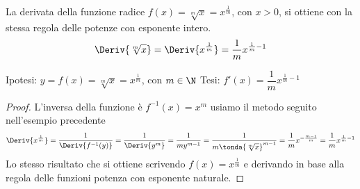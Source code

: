 \begin{teorema}
\label{teo:diff01_deri_x_alla_1_su_m}
La derivata della funzione radice \(f(x)=\sqrt[m]{x}=x^\frac{1}{m}\), 
con \(x > 0\),
si ottiene con la stessa regola delle potenze con esponente intero.
\[\Deriv{\sqrt[m]{x}} = \Deriv{x^\frac{1}{m}} = 
  \frac{1}{m}x^{\frac{1}{m}-1}\]
\end{teorema}
\noindent Ipotesi: \(y = f(x) = \sqrt[m]{x} = x^\frac{1}{m}\), con 
                   \(m \in \N\) 
\tab Tesi: \(f'(x) = \dfrac{1}{m} x^{\frac{1}{m}-1}\) 
\begin{proof}
L'inversa della funzione è \(f^{-1}(x) = x^m\) usiamo il metodo seguito
nell'esempio precedente
\[\Deriv{x^\frac{1}{m}} = \dfrac{1}{\Deriv{f^{-1}(y)}} = 
  \dfrac{1}{\Deriv{y^m}} = \dfrac{1}{my^{m-1}} = 
  \dfrac{1}{m \tonda{\sqrt[m]{x}}^{m-1}} =
  \dfrac{1}{m} x^{-\frac{m-1}{m}} =
  \dfrac{1}{m} x^{\frac{1}{m} -1}\]
Lo stesso risultato che si ottiene scrivendo \(f(x)=x^\frac{1}{m}\) e 
derivando in base alla regola delle funzioni potenza con esponente naturale.
% 
\end{proof}

% 
% 

